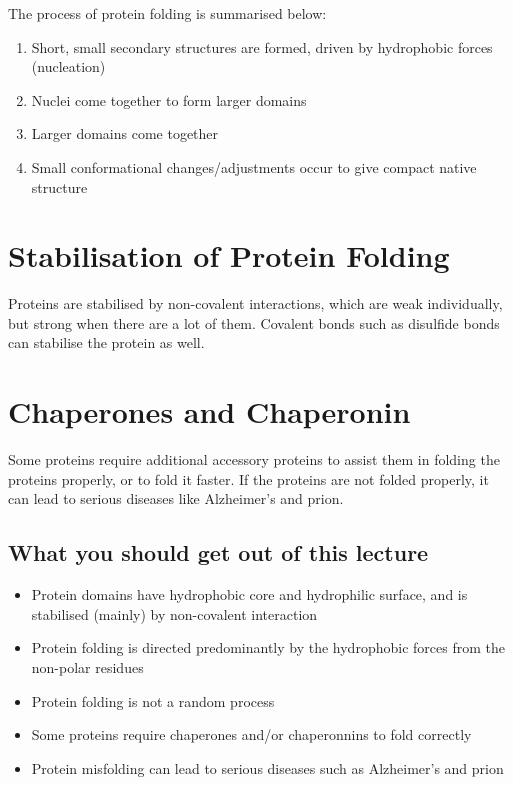 \vspace{0.5cm}

\noindent
The process of protein folding is summarised below:
\begin{enumerate}
\item Short, small secondary structures are formed, driven by hydrophobic forces (nucleation)
\item Nuclei come together to form larger domains
\item Larger domains come together
\item Small conformational changes/adjustments occur to give compact native structure
\end{enumerate}

\section{Stabilisation of Protein Folding}

Proteins are stabilised by non-covalent interactions, which are weak individually, but strong when there are a lot of them.
Covalent bonds such as disulfide bonds can stabilise the protein as well.


\section{Chaperones and Chaperonin}

Some proteins require additional accessory proteins to assist them in folding the proteins properly, or to fold it faster.
If the proteins are not folded properly, it can lead to serious diseases like Alzheimer's and prion.

\begin{center}
\end{center}

\subsection*{What you should get out of this lecture}

\begin{itemize}
	\item Protein domains have hydrophobic core and hydrophilic surface, and is stabilised (mainly) by non-covalent interaction
	\item Protein folding is directed predominantly by the hydrophobic forces from the non-polar residues
	\item Protein folding is not a random process
	\item Some proteins require chaperones and/or chaperonnins to fold correctly
	\item Protein misfolding can lead to serious diseases such as Alzheimer's and prion
\end{itemize}
